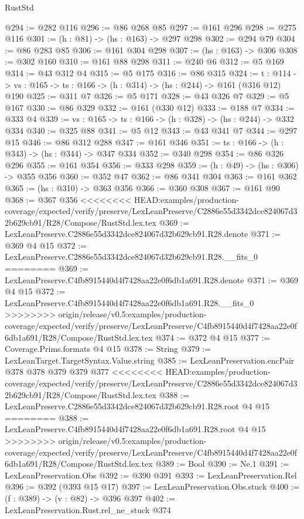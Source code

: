 \begin{lexlean}{RustStd}
\begin{coremodule}
{\begin{coremodule}
@294 := @282 @116
@296 := @86 @268 @85
@297 := @161 @296
@298 := @275 @116
@301 := (h : @81) -> (hs : @163) -> @297 @298
@302 := @294 @79
@304 := @86 @283 @85
@306 := @161 @304 @298
@307 := (hs : @163) -> @306
@308 := @302 @160
@310 := @161 @88 @298
@311 := @240 @6
@312 := @5 @169
@314 := @43 @312 @4
@315 := @5 @175
@316 := @86 @315
@324 := {t : @114} ->
  {vs : @165} -> {ts : @166} -> (h : @314) -> (hs : @244) -> @161 (@316 @12) @190
@325 := @311 @7
@326 := @5 @171
@328 := @43 @326 @7
@329 := @5 @167
@330 := @86 @329
@332 := @161 (@330 @12)
@333 := @188 @7
@334 := @333 @4
@339 := {vs : @165} -> {ts : @166} -> (h : @328) -> (hs : @244) -> @332 @334
@340 := @325 @88
@341 := @5 @12
@343 := @43 @341 @7
@344 := @297 @15
@346 := @86 @312 @288
@347 := @161 @346
@351 := {ts : @166} -> (h : @343) -> (hs : @344) -> @347 @334
@352 := @340 @298
@354 := @86 @326 @296
@355 := @161 @354
@356 := @333 @298
@359 := (h : @49) -> (hs : @306) -> @355 @356
@360 := @352 @47
@362 := @86 @341 @304
@363 := @161 @362
@365 := (hs : @310) -> @363 @356
@366 := @360 @308
@367 := @161 @90
@368 := @367 @356
<<<<<<<< HEAD:examples/production-coverage/expected/verify/preserve/LexLeanPreserve/C2886e55d3342dce824067d32b629cb91/R28/Compose/RustStd.lex.tex
@369 := LexLeanPreserve.C2886e55d3342dce824067d32b629cb91.R28.denote
@371 := @369 @4 @15
@372 := LexLeanPreserve.C2886e55d3342dce824067d32b629cb91.R28.__fits_0
========
@369 := LexLeanPreserve.C4fb8915440d4f7428aa22e0f6db1a691.R28.denote
@371 := @369 @4 @15
@372 := LexLeanPreserve.C4fb8915440d4f7428aa22e0f6db1a691.R28.__fits_0
>>>>>>>> origin/release/v0.5:examples/production-coverage/expected/verify/preserve/LexLeanPreserve/C4fb8915440d4f7428aa22e0f6db1a691/R28/Compose/RustStd.lex.tex
@374 := @372 @4 @15
@377 := Coverage.Prims.formats @4 @15
@378 := String
@379 := LexLeanTarget.TargetSyntax.Value.string
@385 := LexLeanPreservation.encPair @378 @378 @379 @379 @377
<<<<<<<< HEAD:examples/production-coverage/expected/verify/preserve/LexLeanPreserve/C2886e55d3342dce824067d32b629cb91/R28/Compose/RustStd.lex.tex
@388 := LexLeanPreserve.C2886e55d3342dce824067d32b629cb91.R28.root @4 @15
========
@388 := LexLeanPreserve.C4fb8915440d4f7428aa22e0f6db1a691.R28.root @4 @15
>>>>>>>> origin/release/v0.5:examples/production-coverage/expected/verify/preserve/LexLeanPreserve/C4fb8915440d4f7428aa22e0f6db1a691/R28/Compose/RustStd.lex.tex
@389 := Bool
@390 := Ne.{1}
@391 := LexLeanPreservation.Obs
@392 := @390 @391
@393 := LexLeanPreservation.Rel
@396 := @392 (@393 @15 @17)
@397 := LexLeanPreservation.Obs.stuck
@400 := (f : @389) -> (v : @82) -> @396 @397
@402 := LexLeanPreservation.Rust.rel_ne_stuck @374

\end{coremodule}}
\end{coremodule}
\end{lexlean}
